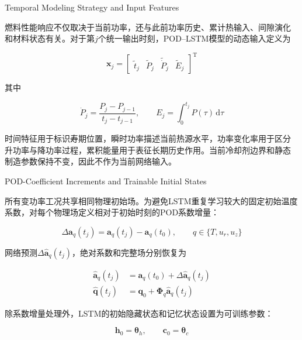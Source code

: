 {Temporal Modeling Strategy and Input Features}

燃料性能响应不仅取决于当前功率，还与此前功率历史、累计热输入、间隙演化
和材料状态有关。对于第$j$个统一输出时刻，POD--LSTM模型的动态输入定义为

\begin{equation}
	\boldsymbol x_j
	=
	\begin{bmatrix}
		\widetilde t_j &
		\widetilde P_j &
		\widetilde{\dot P}_j &
		\widetilde E_j
	\end{bmatrix}^{\mathrm T}
	\label{eq:formal_lstm_features}
\end{equation}

其中

\begin{equation}
	\dot P_j
	=
	\frac{P_j-P_{j-1}}{t_j-t_{j-1}},
	\qquad
	E_j
	=
	\int_0^{t_j}P(\tau)\,\mathrm d\tau
	\label{eq:formal_power_derivative_energy}
\end{equation}

时间特征用于标识寿期位置，瞬时功率描述当前热源水平，功率变化率用于区分
升功率与降功率过程，累积能量用于表征长期历史作用。当前冷却剂边界和静态
制造参数保持不变，因此不作为当前网络输入。

{POD-Coefficient Increments and Trainable Initial States}

所有变功率工况共享相同物理初始场。为避免LSTM重复学习较大的固定初始温度
系数，对每个物理场定义相对于初始时刻的POD系数增量：

\begin{equation}
	\Delta\boldsymbol a_q(t_j)
	=
	\boldsymbol a_q(t_j)-\boldsymbol a_q(t_0),
	\qquad
	q\in\{T,u_r,u_z\}
	\label{eq:formal_coefficient_increment}
\end{equation}

网络预测$\Delta\widehat{\boldsymbol a}_q(t_j)$，绝对系数和完整场分别恢复为

\begin{align}
	\widehat{\boldsymbol a}_q(t_j)
	&=
	\boldsymbol a_q(t_0)
	+
	\Delta\widehat{\boldsymbol a}_q(t_j)
	\label{eq:formal_restore_coefficients}\\
	\widehat{\boldsymbol q}(t_j)
	&=
	\boldsymbol q_0
	+
	\boldsymbol\Phi_q
	\widehat{\boldsymbol a}_q(t_j)
	\label{eq:formal_restore_field}
\end{align}

除系数增量处理外，LSTM的初始隐藏状态和记忆状态设置为可训练参数：

\begin{equation}
	\boldsymbol h_0=\boldsymbol\theta_h,
	\qquad
	\boldsymbol c_0=\boldsymbol\theta_c
	\label{eq:trainable_lstm_initial_states}
\end{equation}

